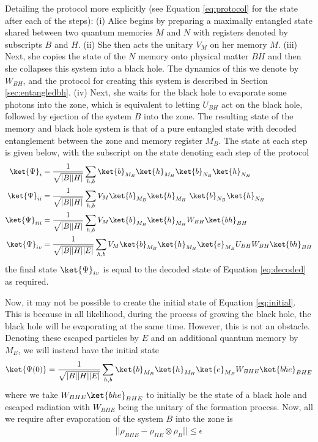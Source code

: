 \documentclass[11pt,a4paper]{article}
\begin{document}
Detailing the protocol more explicitly (see Equation \ref{eq:protocol} for the state after each of the steps): (i)
Alice begins by preparing a maximally entangled state shared between two quantum memories $M$ and $N$ with registers denoted by subscripts $B$ and $H$.
(ii) She then acts the unitary $V_{M}$  on her memory $M$. (iii) Next, she copies the state of the $N$ memory onto physical matter $BH$ and then she collapses this system into a black hole. The dynamics of this we denote by $W_{BH}$, and the protocol for creating this system is described in Section \ref{sec:entangledbh}. (iv) Next, she waits for the black hole to evaporate some photons into the zone, which is equivalent to letting $U_{BH}$ act on the black hole, followed by ejection of the system $B$ into the zone. The resulting state of the memory and black hole system is that of a pure entangled state with decoded entanglement between the zone and memory register $M_B$. The state at each step is given below, with the subscript on the state denoting each step of the protocol
\begin{align}
\ket{\Psi}_i&=\frac{1}{\sqrt{|B||H|}}
\sum_{h,b}\ket{b}_{M_B}\ket{h}_{M_H}\ket{b}_{N_B}\ket{h}_{N_H}\nonumber\\
\ket{\Psi}_{ii}&=\frac{1}{\sqrt{|B||H|}}
\sum_{h,b} V_M\ket{b}_{M_B}\ket{h}_{M_H}\ \ket{b}_{N_B}\ket{h}_{N_H}\nonumber\\
\ket{\Psi}_{iii}&=\frac{1}{\sqrt{|B||H|}}
\sum_{h,b} V_M\ket{b}_{M_B}\ket{h}_{M_H}W_{BH} \ket{bh}_{BH}\nonumber\\
\ket{\Psi}_{iv}&=\frac{1}{\sqrt{|B||H||E|}}
\sum_{h,b} V_M\ket{b}_{M_B}\ket{h}_{M_H}\ket{e}_{M_E}U_{BH}W_{BH} \ket{bh}_{BH} \nonumber\\
\label{eq:protocol}
\end{align} 
the final state $\ket{\Psi}_{iv}$ is equal to the decoded state of Equation \eqref{eq:decoded} as required.
 

Now, it may not be possible to create the initial state of Equation \eqref{eq:initial}. This is because in all likelihood, during the process of growing the black hole, the black hole will be evaporating at the same time. However, this is not an obstacle. Denoting these escaped particles by $E$ and an additional quantum memory by $M_E$,
we will instead have the initial state
\begin{align}
\ket{\Psi(0)}=\frac{1}{\sqrt{|B||H||E|}}
\sum_{h,b}\ket{b}_{M_B}\ket{h}_{M_H}\ket{e}_{M_E} W_{BHE} \ket{bhe}_{BHE}
\label{eq:initialE}
\end{align}
where we take $W_{BHE}\ket{bhe}_{BHE}$ to initially be the state of a black hole and escaped radiation with $W_{BHE}$ being the unitary of the formation
process.  Now, all we require after evaporation of the system $B$ into the zone is
\begin{align}
||\rho_{BHE}-\rho_{HE}\otimes\rho_{B}||\leq \epsilon
\label{eq:productBE}
\end{align}
\end{document}
